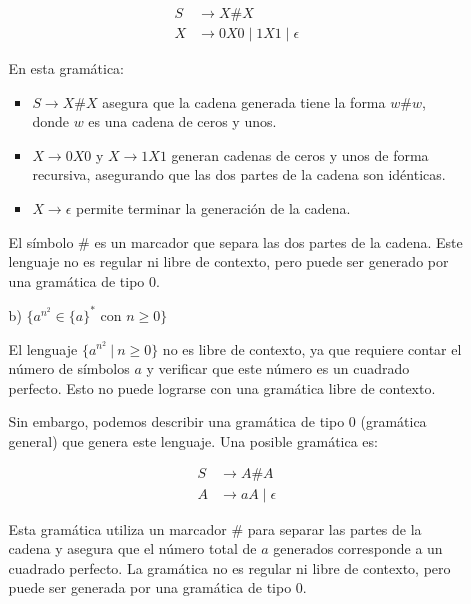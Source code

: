 \documentclass[12pt]{book} %
\begin{document}
\begin{ejercicio}
\begin{itemize}
\begin{itemize}
\begin{solucion}
        \begin{align*}
        S &\to X \# X \\
        X &\to 0X0 \mid 1X1 \mid \epsilon
        \end{align*}

        En esta gramática:
        \begin{itemize}
            \item $S \to X \# X$ asegura que la cadena generada tiene la forma $w \# w$, donde $w$ es una cadena de ceros y unos.
            \item $X \to 0X0$ y $X \to 1X1$ generan cadenas de ceros y unos de forma recursiva, asegurando que las dos partes de la cadena son idénticas.
            \item $X \to \epsilon$ permite terminar la generación de la cadena.
        \end{itemize}

        El símbolo $\#$ es un marcador que separa las dos partes de la cadena. Este lenguaje no es regular ni libre de contexto, pero puede ser generado por una gramática de tipo 0.

        \end{solucion}

        

        

        



        \item[b)] $\{a^{n^2} \in \{a\}^* \text{ con } n \geq 0\}$

        \begin{solucion}

        El lenguaje $\{a^{n^2} \ | \ n \geq 0\}$ no es libre de contexto, ya que requiere contar el número de símbolos $a$ y verificar que este número es un cuadrado perfecto. Esto no puede lograrse con una gramática libre de contexto.

        Sin embargo, podemos describir una gramática de tipo 0 (gramática general) que genera este lenguaje. Una posible gramática es:

        \begin{align*}
        S &\to A \# A \\
        A &\to aA \mid \epsilon
        \end{align*}

        Esta gramática utiliza un marcador $\#$ para separar las partes de la cadena y asegura que el número total de $a$ generados corresponde a un cuadrado perfecto. La gramática no es regular ni libre de contexto, pero puede ser generada por una gramática de tipo 0.


\end{solucion}
\end{itemize}
\end{itemize}
\end{ejercicio}
\end{document}
